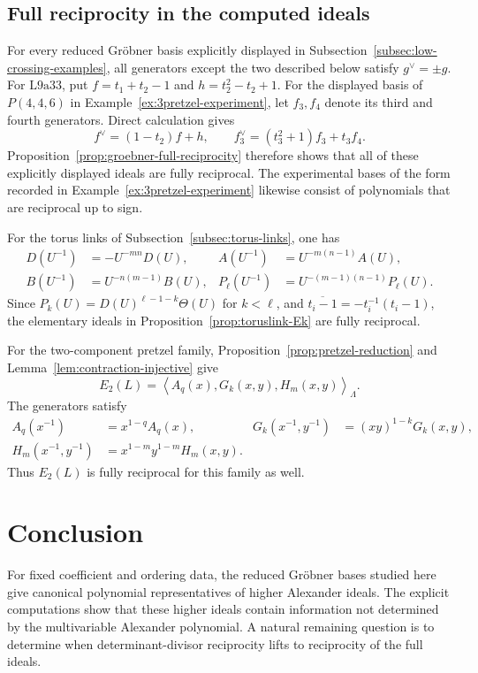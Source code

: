 \documentclass{article}
\theoremstyle{definition}
\theoremstyle{plain}
\newcommand{\ideal}[1]{\left\langle #1 \right\rangle}
\begin{document}
\subsection{Full reciprocity in the computed ideals}
\label{subsec:reciprocity-examples}

For every reduced Gr\"obner basis explicitly displayed in
Subsection~\ref{subsec:low-crossing-examples}, all generators except the
two described below satisfy \(g^\vee=\pm g\).  For \(\mathrm{L9a33}\), put
\(f=t_1+t_2-1\) and \(h=t_2^2-t_2+1\).  For the displayed basis of
\(P(4,4,6)\) in Example~\ref{ex:3pretzel-experiment}, let \(f_3,f_4\)
denote its third and fourth generators.  Direct calculation gives
\[
 f^\vee=(1-t_2)f+h,
 \qquad
 f_3^\vee=(t_3^2+1)f_3+t_3f_4.
\]
Proposition~\ref{prop:groebner-full-reciprocity} therefore shows that all
of these explicitly displayed ideals are fully reciprocal.  The
experimental bases of the form recorded in
Example~\ref{ex:3pretzel-experiment} likewise consist of polynomials that are reciprocal up to sign.

For the torus links of Subsection~\ref{subsec:torus-links}, one has
\[
\begin{aligned}
 D(U^{-1})&=-U^{-mn}D(U),
 &A(U^{-1})&=U^{-m(n-1)}A(U),\\
 B(U^{-1})&=U^{-n(m-1)}B(U),
 &P_\ell(U^{-1})&=U^{-(m-1)(n-1)}P_\ell(U).
\end{aligned}
\]
Since \(P_k(U)=D(U)^{\ell-1-k}\Theta(U)\) for \(k<\ell\), and
\(\overline{t_i-1}=-t_i^{-1}(t_i-1)\), the elementary ideals in
Proposition~\ref{prop:toruslink-Ek} are fully reciprocal.

For the two-component pretzel family,
Proposition~\ref{prop:pretzel-reduction} and
Lemma~\ref{lem:contraction-injective} give
\[
 E_2(L)=\ideal{A_q(x),G_k(x,y),H_m(x,y)}_{\Lambda}.
\]
The generators satisfy
\[
\begin{aligned}
 A_q(x^{-1})&=x^{1-q}A_q(x),
 &G_k(x^{-1},y^{-1})&=(xy)^{1-k}G_k(x,y),\\
 H_m(x^{-1},y^{-1})&=x^{1-m}y^{1-m}H_m(x,y).
\end{aligned}
\]
Thus \(E_2(L)\) is fully reciprocal for this family as well.

\section*{Conclusion}

For fixed coefficient and ordering data, the reduced
Gr\"obner bases studied here give canonical polynomial
representatives of higher Alexander ideals.  The explicit
computations show that these higher ideals contain
information not determined by the multivariable Alexander
polynomial.  A natural remaining question is to determine
when determinant-divisor reciprocity lifts to reciprocity
of the full ideals.
\end{document}
